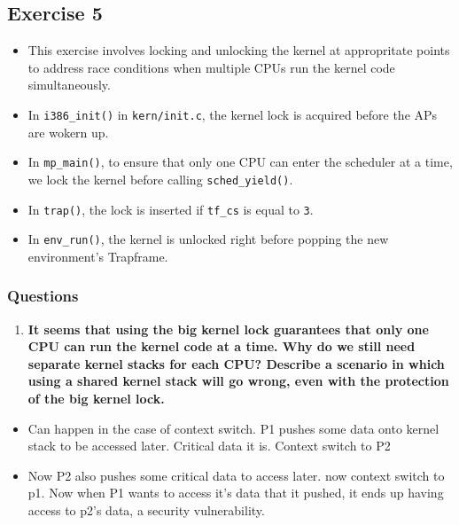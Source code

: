 \documentclass[]{article}
\begin{document}
\subsection{Exercise 5}

\begin{itemize}
\itemsep1pt\parskip0pt
\item
  This exercise involves locking and unlocking the kernel at
  appropritate points to address race conditions when multiple CPUs run
  the kernel code simultaneously.
\item
  In \texttt{i386\_init()} in \texttt{kern/init.c}, the kernel lock is
  acquired before the APs are wokern up.
\item
  In \texttt{mp\_main()}, to ensure that only one CPU can enter the
  scheduler at a time, we lock the kernel before calling
  \texttt{sched\_yield()}.
\item
  In \texttt{trap()}, the lock is inserted if \texttt{tf\_cs} is equal
  to \texttt{3}.
\item
  In \texttt{env\_run()}, the kernel is unlocked right before popping
  the new environment's Trapframe.
\end{itemize}

\subsubsection{Questions}

\begin{enumerate}
\def\labelenumi{\arabic{enumi}.}
\setcounter{enumi}{1}
\itemsep1pt\parskip0pt
\item
  \textbf{It seems that using the big kernel lock guarantees that only
  one CPU can run the kernel code at a time. Why do we still need
  separate kernel stacks for each CPU? Describe a scenario in which
  using a shared kernel stack will go wrong, even with the protection of
  the big kernel lock.}
\end{enumerate}

\begin{itemize}
\itemsep1pt\parskip0pt
\item
  Can happen in the case of context switch. P1 pushes some data onto
  kernel stack to be accessed later. Critical data it is. Context switch
  to P2
\item
  Now P2 also pushes some critical data to access later. now context
  switch to p1. Now when P1 wants to access it's data that it pushed, it
  ends up having access to p2's data, a security vulnerability.
\end{itemize}
\end{document}
